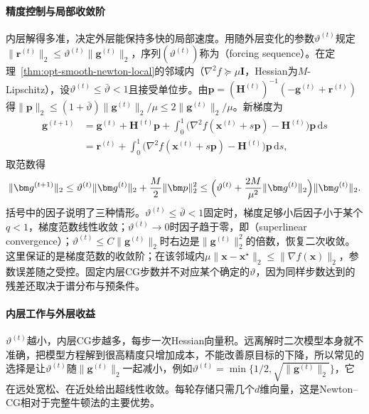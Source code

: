 \paragraph{精度控制与局部收敛阶}
内层解得多准，决定外层能保持多快的局部速度。用随外层变化的参数$\vartheta^{(t)}$规定$\lVert\bm r^{(t)}\rVert_2\leq\vartheta^{(t)}\lVert\bm g^{(t)}\rVert_2$，序列$(\vartheta^{(t)})$称为（forcing sequence）。在定理~\ref{thm:opt-smooth-newton-local}的邻域内（$\nabla^2f\succeq\mu\bm I$，Hessian为$M$-Lipschitz），设$\vartheta^{(t)}\leq\bar\vartheta<1$且接受单位步。由$\bm p=(\bm H^{(t)})^{-1}(-\bm g^{(t)}+\bm r^{(t)})$得$\lVert\bm p\rVert_2\leq(1+\bar\vartheta)\lVert\bm g^{(t)}\rVert_2/\mu\leq2\lVert\bm g^{(t)}\rVert_2/\mu$。新梯度为
\[
  \begin{aligned}
  \bm g^{(t+1)}&=\bm g^{(t)}+\bm H^{(t)}\bm p+\int_0^1\bigl(\nabla^2f(\bm x^{(t)}+s\bm p)-\bm H^{(t)}\bigr)\bm p\,\mathrm ds\\
  &=\bm r^{(t)}+\int_0^1\bigl(\nabla^2f(\bm x^{(t)}+s\bm p)-\bm H^{(t)}\bigr)\bm p\,\mathrm ds ,
  \end{aligned}
\]
取范数得
\begin{equation}
\label{eq:opt-smooth-inexact-newton}
  \lVert\bm g^{(t+1)}\rVert_2\leq\vartheta^{(t)}\lVert\bm g^{(t)}\rVert_2+\frac M2\lVert\bm p\rVert_2^2\leq\Bigl(\vartheta^{(t)}+\frac{2M}{\mu^2}\lVert\bm g^{(t)}\rVert_2\Bigr)\lVert\bm g^{(t)}\rVert_2 .
\end{equation}
括号中的因子说明了三种情形。$\vartheta^{(t)}\leq\bar\vartheta<1$固定时，梯度足够小后因子小于某个$q<1$，梯度范数线性收敛；$\vartheta^{(t)}\to0$时因子趋于零，即（superlinear convergence）；$\vartheta^{(t)}\leq C\lVert\bm g^{(t)}\rVert_2$时右边是$\lVert\bm g^{(t)}\rVert_2^2$的倍数，恢复二次收敛。这里保证的是梯度范数的收敛阶；在该邻域内$\mu\lVert\bm x-\bm x^\star\rVert_2\leq\lVert\nabla f(\bm x)\rVert_2$，参数误差随之受控。固定内层CG步数并不对应某个确定的$\vartheta$，因为同样步数达到的残差还取决于谱分布与预条件。

\paragraph{内层工作与外层收益}
$\vartheta^{(t)}$越小，内层CG步越多，每步一次Hessian向量积。远离解时二次模型本身就不准确，把模型方程解到很高精度只增加成本，不能改善原目标的下降，所以常见的选择是让$\vartheta^{(t)}$随$\lVert\bm g^{(t)}\rVert_2$一起减小，例如$\vartheta^{(t)}=\min\{1/2,\sqrt{\lVert\bm g^{(t)}\rVert_2}\}$，它在远处宽松、在近处给出超线性收敛。每轮存储只需几个$d$维向量，这是Newton--CG相对于完整牛顿法的主要优势。

